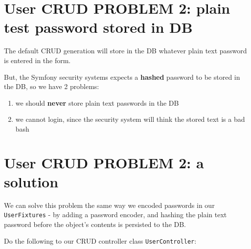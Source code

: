 \documentclass[a4paperpaper,openright]{book}
\begin{document}
\hypertarget{user-crud-problem-2-plain-test-password-stored-in-db}{%
\section{User CRUD PROBLEM 2: plain test password stored in
DB}\label{user-crud-problem-2-plain-test-password-stored-in-db}}

The default CRUD generation will store in the DB whatever plain text
password is entered in the form.

But, the Symfony security systems expects a \textbf{hashed} password to
be stored in the DB, so we have 2 problems:

\begin{enumerate}
\def\labelenumi{\arabic{enumi}.}
\item
  we should \textbf{never} store plain text passwords in the DB
\item
  we cannot login, since the security system will think the stored text
  is a bad bash
\end{enumerate}

\hypertarget{user-crud-problem-2-a-solution}{%
\section{User CRUD PROBLEM 2: a
solution}\label{user-crud-problem-2-a-solution}}

We can solve this problem the same way we encoded passwords in our
\texttt{UserFixtures} - by adding a password encoder, and hashing the
plain text password before the object's contents is persisted to the DB.

Do the following to our CRUD controller class \texttt{UserController}:
\end{document}

